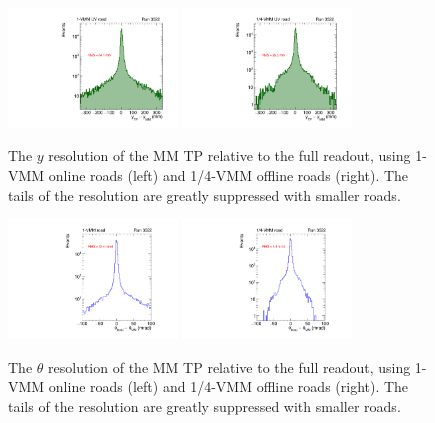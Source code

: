 \begin{figure}[!htpb]
  \begin{center}
    \includegraphics[width=0.4\textwidth]{figures/gbtanalysis3522/TP_yres_1road.pdf}
    \includegraphics[width=0.4\textwidth]{figures/gbtanalysis3522/TP_yres_smallroad.pdf}
  \end{center}
  \vspace{-10pt}
  \caption{The $y$ resolution of the MM TP relative to the full readout, using 1-VMM online roads (left) and 1/4-VMM offline roads (right). The tails of the resolution are greatly suppressed with smaller roads.}
  \label{fig:yres}
\end{figure}

\begin{figure}[!htpb]
  \begin{center}
    \includegraphics[width=0.4\textwidth]{figures/gbtanalysis3522/TP_angres_full.pdf}
    \includegraphics[width=0.4\textwidth]{figures/gbtanalysis3522/TP_angres.pdf}
  \end{center}
  \vspace{-10pt}
  \caption{The $\theta$ resolution of the MM TP relative to the full readout, using 1-VMM online roads (left) and 1/4-VMM offline roads (right). The tails of the resolution are greatly suppressed with smaller roads.}
  \label{fig:thetares}
\end{figure}

